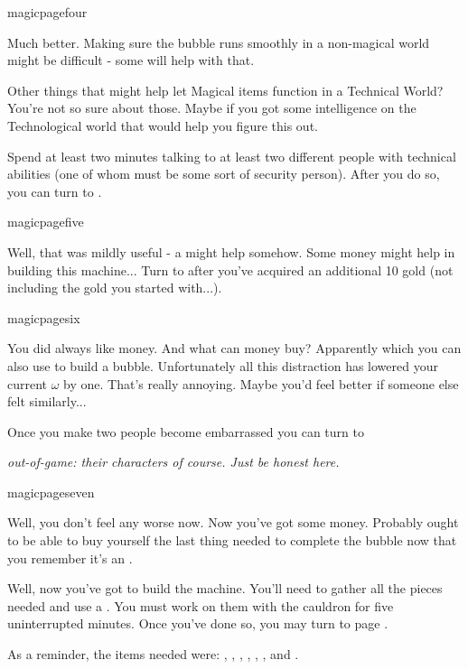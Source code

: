 \documentclass[greennotebook]{guildcamp3} %
\begin{document}
\begin{page}[good...]{magicpagefour}

Much better. Making sure the bubble runs smoothly in a non-magical world might be difficult - some \iHolyWater{} will help with that. 

Other things that might help let Magical items function in a Technical World? You're not so sure about those. Maybe if you got some intelligence on the Technological world that would help you figure this out. 

Spend at least two minutes talking to at least two different people with technical abilities (one of whom must be some sort of security person). After you do so, you can turn to .
	
\end{page}

\begin{page}{magicpagefive}
	
Well, that was mildly useful - a \iBelladonna{} might help somehow. Some money might help in building this machine... Turn to  after you've acquired an additional 10 gold (not including the gold you started with...).


	
\end{page}

\begin{page}{magicpagesix}

You did always like money. And what can money buy? Apparently \iDragonSkin{} which you can also use to build a bubble. Unfortunately all this distraction has lowered your current $\omega$ by one. That's really annoying. Maybe you'd feel better if someone else felt similarly...

Once you make two people become embarrassed you can turn to  

\emph{out-of-game: their characters of course. Just be honest here.}
	



	
\end{page}

\begin{page}{magicpageseven}
	
	Well, you don't feel any worse now. Now you've got some money. Probably ought to be able to buy yourself the last thing needed to complete the bubble now that you remember it's an \iUnicornHoof{}. 
	
	Well, now you've got to build the machine. You'll need to gather all the pieces needed and use a \iCauldron{}. You must work on them with the cauldron  for five uninterrupted minutes. Once you've done so, you may turn to page . 
	
	As a reminder, the items needed were: \iUnicornHoof{}, \iDragonSkin{}, \iBelladonna{}, \iHolyWater{}, \iWerewolfFang{}, \iStardust{}, and \iScrapMetal{}. 
	
	
	 
\end{page}
\end{document}
